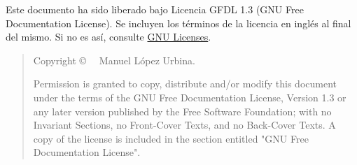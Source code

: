 Este documento ha sido liberado bajo Licencia GFDL 1.3 (GNU Free Documentation License). Se incluyen los términos de la licencia en inglés al final del mismo. Si no es así, 
consulte \href{http://www.gnu.org/licenses/}{GNU Licenses}.\\\bigskip

\begin{quote}
Copyright \copyright~\the\year~ Manuel López Urbina.\bigskip

Permission is granted to copy, distribute and/or modify this document under the terms of the GNU Free Documentation License, Version 1.3 or  any later version published by the Free Software Foundation; with no Invariant Sections, no Front-Cover Texts, and no Back-Cover Texts. A copy of the license is included
in the section entitled "GNU Free Documentation License".
\end{quote}


\cleardoublepage

